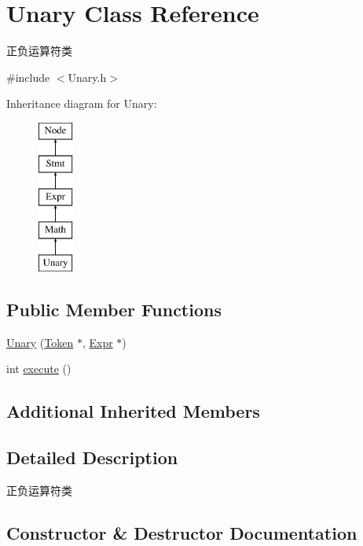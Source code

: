 \hypertarget{class_unary}{}\section{Unary Class Reference}
\label{class_unary}


正负运算符类  




{\ttfamily \#include $<$Unary.\+h$>$}

Inheritance diagram for Unary\+:\begin{figure}[H]
\begin{center}
\leavevmode
\includegraphics[height=5.000000cm]{class_unary}
\end{center}
\end{figure}
\subsection*{Public Member Functions}
\begin{DoxyCompactItemize}
\item 
\hyperlink{class_unary_ab8a81af2bbab768401579659ce929e53}{Unary} (\hyperlink{class_token}{Token} $\ast$, \hyperlink{class_expr}{Expr} $\ast$)
\item 
int \hyperlink{class_unary_af42edff1ee4718a9afeb7127e41af758}{execute} ()
\end{DoxyCompactItemize}
\subsection*{Additional Inherited Members}


\subsection{Detailed Description}
正负运算符类 

\subsection{Constructor \& Destructor Documentation}
\mbox{\label{class_unary_ab8a81af2bbab768401579659ce929e53}} 
